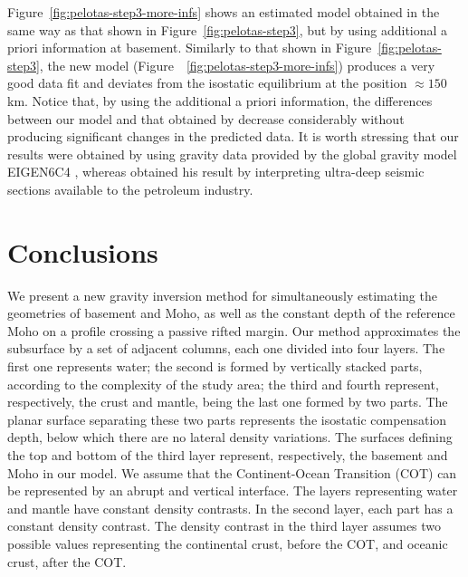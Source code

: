 \documentclass[manuscript]{geophysics}
\begin{document}
Figure~\ref{fig:pelotas-step3-more-infs} shows an estimated model
obtained in the same way as that shown in Figure~\ref{fig:pelotas-step3},
but by using additional a priori information at basement.
Similarly to that shown in Figure~\ref{fig:pelotas-step3},
the new model (Figure~~\ref{fig:pelotas-step3-more-infs}) produces a very good data fit 
and deviates from the isostatic equilibrium at the position $\approx 150$ km. 
Notice that, by using the additional a priori information, the differences between our model
and that obtained by \citet{zalan2015} decrease considerably without producing
significant changes in the predicted data.
It is worth stressing that our results were obtained by using gravity data
provided by the global gravity model EIGEN6C4 \citep{forste2014}, whereas 
\citet{zalan2015} obtained his result by interpreting ultra-deep seismic sections
available to the petroleum industry.


\section{Conclusions}

We present a new gravity inversion method for simultaneously estimating the 
geometries of basement and Moho, as well as the constant depth of the reference Moho 
on a profile crossing a passive rifted margin.
Our method approximates the subsurface by a set of adjacent columns, each one divided
into four layers. The first one represents water; the second is formed by vertically
stacked parts, according to the complexity of the study area; the third and fourth represent,
respectively, the crust and mantle, being the last one formed by two parts.
The planar surface separating these two parts represents the isostatic compensation depth,
below which there are no lateral density variations.
The surfaces defining the top and bottom of the third layer represent, respectively, 
the basement and Moho in our model.
We assume that the Continent-Ocean Transition (COT) can be represented by an abrupt and 
vertical interface.
The layers representing water and mantle have constant density contrasts.
In the second layer, each part has a constant density contrast.
The density contrast in the third layer assumes two possible values representing
the continental crust, before the COT, and oceanic crust, after the COT.
\end{document}

